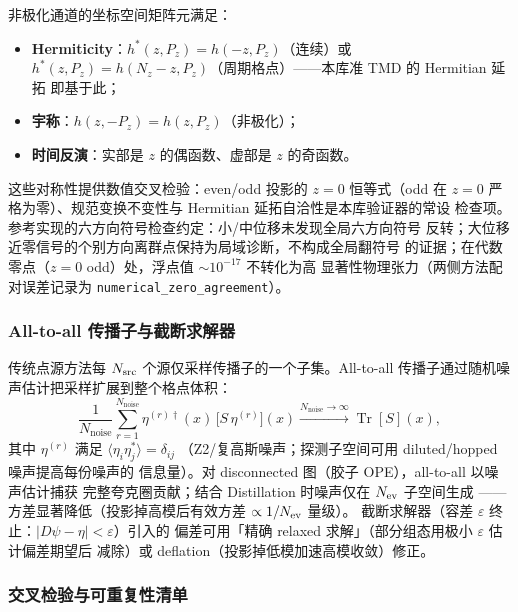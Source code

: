 \documentclass[11pt,a4paper]{ctexart}
\newcommand{\eps}{\varepsilon}
\newcommand{\code}[1]{\texttt{#1}}
\begin{document}
非极化通道的坐标空间矩阵元满足：
\begin{itemize}
  \item \textbf{Hermiticity}：$h^*(z,P_z)=h(-z,P_z)$（连续）或
  $h^*(z,P_z)=h(N_z-z,P_z)$（周期格点）——本库准 TMD 的 Hermitian 延拓
  即基于此；
  \item \textbf{宇称}：$h(z,-P_z)=h(z,P_z)$（非极化）；
  \item \textbf{时间反演}：实部是 $z$ 的偶函数、虚部是 $z$ 的奇函数。
\end{itemize}
这些对称性提供数值交叉检验：even/odd 投影的 $z=0$ 恒等式（odd 在 $z=0$
严格为零）、规范变换不变性与 Hermitian 延拓自洽性是本库验证器的常设
检查项。参考实现的六方向符号检查约定：小/中位移未发现全局六方向符号
反转；大位移近零信号的个别方向离群点保持为局域诊断，不构成全局翻符号
的证据；在代数零点（$z=0$ odd）处，浮点值 $\sim10^{-17}$ 不转化为高
显著性物理张力（两侧方法配对误差记录为
\code{numerical\_zero\_agreement}）。

\subsubsection{All-to-all 传播子与截断求解器}

传统点源方法每 $N_{\rm src}$ 个源仅采样传播子的一个子集。All-to-all
传播子通过随机噪声估计把采样扩展到整个格点体积：
\begin{equation}
\frac{1}{N_{\text{noise}}} \sum_{r=1}^{N_{\text{noise}}}
\eta^{(r)\dagger}(x)\,\bigl[S\,\eta^{(r)}\bigr](x)
\xrightarrow{N_{\text{noise}} \to \infty} \operatorname{Tr}[S](x),
\end{equation}
其中 $\eta^{(r)}$ 满足 $\langle\eta_i\eta_j^*\rangle=\delta_{ij}$
（Z2/复高斯噪声；探测子空间可用 diluted/hopped 噪声提高每份噪声的
信息量）。对 disconnected 图（胶子 OPE），all-to-all 以噪声估计捕获
完整夸克圈贡献；结合 Distillation 时噪声仅在 $N_{\rm ev}$ 子空间生成
——方差显著降低（投影掉高模后有效方差 $\propto1/N_{\rm ev}$ 量级）。
截断求解器（容差 $\eps$ 终止：$\lvert D\psi-\eta\rvert<\eps$）引入的
偏差可用「精确 relaxed 求解」（部分组态用极小 $\eps$ 估计偏差期望后
减除）或 deflation（投影掉低模加速高模收敛）修正。

\subsubsection{交叉检验与可重复性清单}
\end{document}
